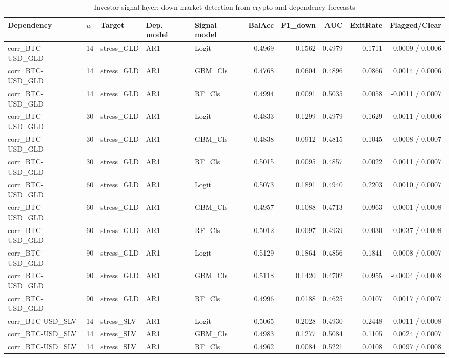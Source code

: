 \begin{table}[H]
\centering
\small
\caption{Investor signal layer: down-market detection from crypto and dependency forecasts}
\label{tab:signal_metrics}
\begin{tabular}{lllllrrrrr}
\toprule
Dependency & $w$ & Target & Dep. model & Signal model & BalAcc & F1_down & AUC & ExitRate & Flagged/Clear \\
\midrule
corr_BTC-USD_GLD & 14 & stress_GLD & AR1 & Logit & 0.4969 & 0.1562 & 0.4979 & 0.1711 & 0.0009 / 0.0006 \\
corr_BTC-USD_GLD & 14 & stress_GLD & AR1 & GBM_Cls & 0.4768 & 0.0604 & 0.4896 & 0.0866 & 0.0014 / 0.0006 \\
corr_BTC-USD_GLD & 14 & stress_GLD & AR1 & RF_Cls & 0.4994 & 0.0091 & 0.5035 & 0.0058 & -0.0011 / 0.0007 \\
corr_BTC-USD_GLD & 30 & stress_GLD & AR1 & Logit & 0.4833 & 0.1299 & 0.4979 & 0.1629 & 0.0011 / 0.0006 \\
corr_BTC-USD_GLD & 30 & stress_GLD & AR1 & GBM_Cls & 0.4838 & 0.0912 & 0.4815 & 0.1045 & 0.0008 / 0.0007 \\
corr_BTC-USD_GLD & 30 & stress_GLD & AR1 & RF_Cls & 0.5015 & 0.0095 & 0.4857 & 0.0022 & 0.0011 / 0.0007 \\
corr_BTC-USD_GLD & 60 & stress_GLD & AR1 & Logit & 0.5073 & 0.1891 & 0.4940 & 0.2203 & 0.0010 / 0.0007 \\
corr_BTC-USD_GLD & 60 & stress_GLD & AR1 & GBM_Cls & 0.4957 & 0.1088 & 0.4713 & 0.0963 & -0.0001 / 0.0008 \\
corr_BTC-USD_GLD & 60 & stress_GLD & AR1 & RF_Cls & 0.5012 & 0.0097 & 0.4939 & 0.0030 & -0.0037 / 0.0008 \\
corr_BTC-USD_GLD & 90 & stress_GLD & AR1 & Logit & 0.5129 & 0.1864 & 0.4856 & 0.1841 & 0.0008 / 0.0007 \\
corr_BTC-USD_GLD & 90 & stress_GLD & AR1 & GBM_Cls & 0.5118 & 0.1420 & 0.4702 & 0.0955 & -0.0004 / 0.0008 \\
corr_BTC-USD_GLD & 90 & stress_GLD & AR1 & RF_Cls & 0.4996 & 0.0188 & 0.4625 & 0.0107 & 0.0017 / 0.0007 \\
corr_BTC-USD_SLV & 14 & stress_SLV & AR1 & Logit & 0.5065 & 0.2028 & 0.4930 & 0.2448 & 0.0011 / 0.0008 \\
corr_BTC-USD_SLV & 14 & stress_SLV & AR1 & GBM_Cls & 0.4983 & 0.1277 & 0.5084 & 0.1105 & 0.0024 / 0.0007 \\
corr_BTC-USD_SLV & 14 & stress_SLV & AR1 & RF_Cls & 0.4962 & 0.0084 & 0.5221 & 0.0108 & 0.0097 / 0.0008 \\

\end{tabular}
\end{table}
